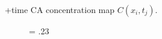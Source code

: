 \documentclass[journal,twocolumn]{IEEEtran}
\newlength{\fwd}
\begin{document}
+time CA concentration map $C(x_i,t_j)$.
		
\begin{figure}[h!tb]
	\centering
	\fwd = .23\textwidth
	\begi
\end{figure}
\end{document}
